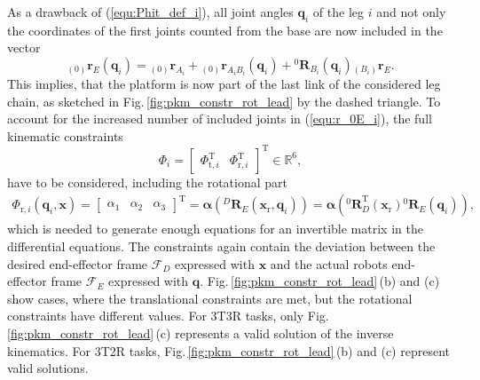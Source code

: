 \documentclass[robotics,article,submit,moreauthors,pdftex]{Definitions/mdpi}
\newcommand{\bm}[1]{\boldsymbol{#1}}
\newcommand{\ortvek}[4]{{ }_{(#1)}{\boldsymbol{#2}}^{#3}_{#4} }
\newcommand{\rotmat}[2]{{{ }^{#1}\boldsymbol{R}}_{#2}}
\newcommand{\transp}[0]{{\mathrm{T}}}
\newcommand{\ks}[1]{{\mathcal{F}}_{#1}}
\let\Phi\varPhi
\begin{document}
As a drawback of (\ref{equ:Phit_def_i}), all joint angles $\bm{q}_i$ of the leg $i$ and not only the coordinates of the first joints counted from the base are now included in the vector
%
\begin{equation}
\ortvek{0}{r}{}{E}(\bm{q}_i) = 
\ortvek{0}{r}{}{A_i}
+ \ortvek{0}{r}{}{A_iB_i}(\bm{q}_i) + \rotmat{0}{B_i}(\bm{q}_i) \ortvek{B_i}{r}{}{E}.
\label{equ:r_0E_i}
\end{equation}
%
This implies, that the platform is now part of the last link of the considered leg chain, as sketched in Fig.\,\ref{fig:pkm_constr_rot_lead} by the dashed triangle.
To account for the increased number of included joints in (\ref{equ:r_0E_i}), the full kinematic constraints
%
\begin{equation}
\bm{\Phi}_i=\begin{bmatrix}
\bm{\Phi}_{\mathrm{t},i}^\transp & \bm{\Phi}_{\mathrm{r},i}^\transp
\end{bmatrix}^\transp \in {\mathbb{R}}^{6},
\label{equ:Phi_def}
\end{equation}
%
have to be considered, including the rotational part
%
\begin{align}
\bm{\Phi}_{\mathrm{r},i}(\bm{q}_i,\bm{x})
=
\begin{bmatrix}
\alpha_1  & \alpha_2 & \alpha_3
\end{bmatrix}^\transp
=
\bm{\alpha}\left(\rotmat{D}{E}(\bm{x}_{\mathrm{r}},\bm{q}_i)\right)
=
\bm{\alpha}\left(\rotmat{0}{D}^\transp (\bm{x}_{\mathrm{r}})\rotmat{0}{E}(\bm{q}_i)\right),
\label{equ:Phir_def_i}
\end{align}
%
which is needed to generate enough equations for an invertible matrix in the differential equations.
The constraints again contain the deviation between the desired end-effector frame $\ks{D}$ expressed with $\bm{x}$ and the actual robots end-effector frame $\ks{E}$ expressed with $\bm{q}$.
Fig.\,\ref{fig:pkm_constr_rot_lead}\,(b) and (c) show cases, where the translational constraints are met, but the rotational constraints have different values.
For 3T3R tasks, only Fig.\,\ref{fig:pkm_constr_rot_lead}\,(c) represents a valid solution of the inverse kinematics. For 3T2R tasks, Fig.\,\ref{fig:pkm_constr_rot_lead}\,(b) and (c) represent valid solutions.
\end{document}
